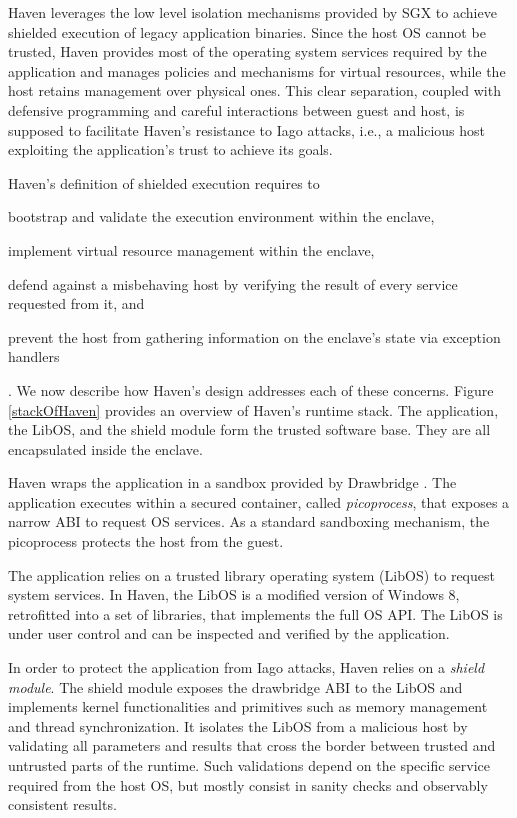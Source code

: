 Haven leverages the low level isolation mechanisms provided by SGX to achieve shielded execution of legacy application binaries.
Since the host OS cannot be trusted, Haven provides most of the operating system services required by the application and manages policies and mechanisms for virtual resources, while the host retains management over physical ones.
This clear separation, coupled with defensive programming and careful interactions between guest and host, is supposed to facilitate Haven's resistance to Iago attacks, i.e., a malicious host exploiting the application's trust to achieve its goals.

Haven's definition of shielded execution requires to
\begin{enumerate*}
	\item bootstrap and validate the execution environment within the enclave,
	\item implement virtual resource management within the enclave,
	\item defend against a misbehaving host by verifying the result of every service requested from it, and
	\item prevent the host from gathering information on the enclave's state via exception handlers
\end{enumerate*}.
We now describe how Haven's design addresses each of these concerns.
Figure \ref{stackOfHaven} provides an overview of Haven's runtime stack.
The application, the LibOS, and the shield module form the trusted software base.
They are all encapsulated inside the enclave.

Haven wraps the application in a sandbox provided by Drawbridge \cite{DBLP:conf/asplos/PorterBHOH11}.
The application executes within a secured container, called \emph{picoprocess}, that exposes a narrow ABI to request OS services.
As a standard sandboxing mechanism, the picoprocess protects the host from the guest.

The application relies on a trusted library operating system (LibOS) to request system services.
In Haven, the LibOS is a modified version of Windows 8, retrofitted into a set of libraries, that implements the full OS API.
The LibOS is under user control and can be inspected and verified by the application.

In order to protect the application from Iago attacks, Haven relies on a \emph{shield module}.
The shield module exposes the drawbridge ABI to the LibOS and implements kernel functionalities and primitives such as memory management and thread synchronization.
It isolates the LibOS from a malicious host by validating all parameters and results that cross the border between trusted and untrusted parts of the runtime.
Such validations depend on the specific service required from the host OS, but mostly consist in sanity checks and observably consistent results.

